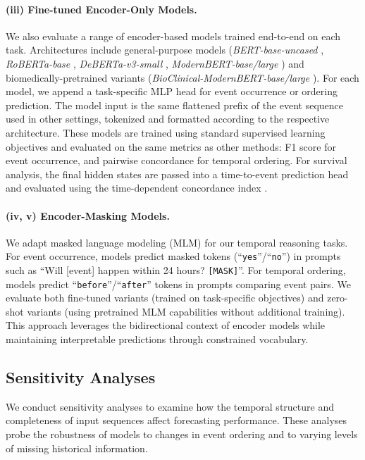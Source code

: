 \documentclass[letterpaper]{article} %
\begin{document}
\paragraph{(iii) Fine-tuned Encoder-Only Models.}  
We also evaluate a range of encoder-based models trained end-to-end on each task. 
Architectures include general-purpose models (\textit{BERT-base-uncased} \citep{devlin2019bert}, \textit{RoBERTa-base} \citep{liu2019roberta}, \textit{DeBERTa-v3-small} \citep{he2021debertav3}, \textit{ModernBERT-base/large} \citep{warner2024smarter}) and biomedically-pretrained variants (\textit{BioClinical-ModernBERT-base/large} \citep{sounack2025bioclinical}).
For each model, we append a task-specific MLP head for event occurrence or ordering prediction. 
The model input is the same flattened prefix of the event sequence used in other settings, tokenized and formatted according to the respective architecture. 
These models are trained using standard supervised learning objectives and evaluated on the same metrics as other methods: F1 score for event occurrence, and pairwise concordance for temporal ordering. 
For survival analysis, the final hidden states are passed into a time-to-event prediction head and evaluated using the time-dependent concordance index \citep{antolini2005time}.

\paragraph{(iv, v) Encoder-Masking Models.}
We adapt masked language modeling (MLM) for our temporal reasoning tasks. For event occurrence, models predict masked tokens (``\texttt{yes}''/``\texttt{no}'') in prompts such as ``Will [event] happen within 24 hours? \texttt{[MASK]}''. For temporal ordering, models predict ``\texttt{before}''/``\texttt{after}'' tokens in prompts comparing event pairs. We evaluate both fine-tuned variants (trained on task-specific objectives) and zero-shot variants (using pretrained MLM capabilities without additional training). This approach leverages the bidirectional context of encoder models while maintaining interpretable predictions through constrained vocabulary.

\subsection{Sensitivity Analyses}
We conduct sensitivity analyses to examine how the temporal structure and completeness of input sequences affect forecasting performance. These analyses probe the robustness of models to changes in event ordering and to varying levels of missing historical information.
\end{document}
